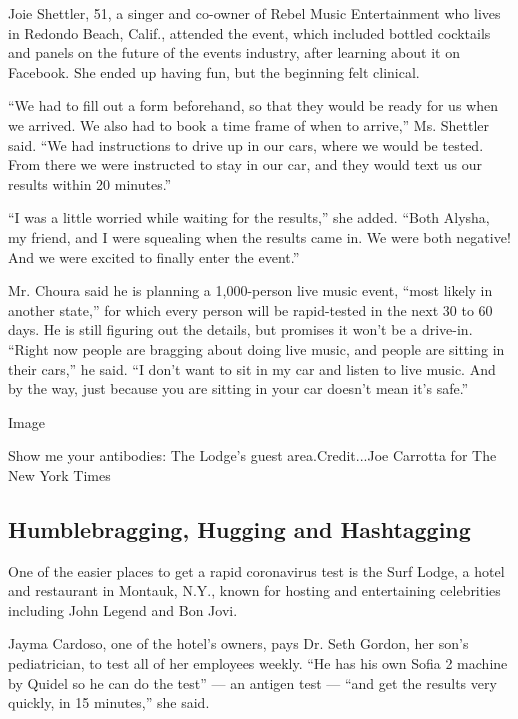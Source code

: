 Joie Shettler, 51, a singer and co-owner of Rebel Music Entertainment
who lives in Redondo Beach, Calif., attended the event, which included
bottled cocktails and panels on the future of the events industry, after
learning about it on Facebook. She ended up having fun, but the
beginning felt clinical.

``We had to fill out a form beforehand, so that they would be ready for
us when we arrived. We also had to book a time frame of when to
arrive,'' Ms. Shettler said. ``We had instructions to drive up in our
cars, where we would be tested. From there we were instructed to stay in
our car, and they would text us our results within 20 minutes.''

``I was a little worried while waiting for the results,'' she added.
``Both Alysha, my friend, and I were squealing when the results came in.
We were both negative! And we were excited to finally enter the event.''

Mr. Choura said he is planning a 1,000-person live music event, ``most
likely in another state,'' for which every person will be rapid-tested
in the next 30 to 60 days. He is still figuring out the details, but
promises it won't be a drive-in. ``Right now people are bragging about
doing live music, and people are sitting in their cars,'' he said. ``I
don't want to sit in my car and listen to live music. And by the way,
just because you are sitting in your car doesn't mean it's safe.''

Image

Show me your antibodies: The Lodge's guest area.Credit...Joe Carrotta
for The New York Times

\hypertarget{humblebragging-hugging-and-hashtagging}{%
\subsection{Humblebragging, Hugging and
Hashtagging}\label{humblebragging-hugging-and-hashtagging}}

One of the easier places to get a rapid coronavirus test is the Surf
Lodge, a hotel and restaurant in Montauk, N.Y., known for hosting and
entertaining celebrities including John Legend and Bon Jovi.

Jayma Cardoso, one of the hotel's owners, pays Dr. Seth Gordon, her
son's pediatrician, to test all of her employees weekly. ``He has his
own Sofia 2 machine by Quidel so he can do the test'' --- an antigen
test --- ``and get the results very quickly, in 15 minutes,'' she said.

